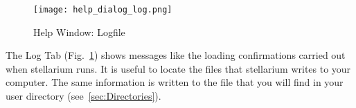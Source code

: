 \begin{figure}[htbp]
\centering\texttt{[image: help\_dialog\_log.png]}
\caption{Help Window: Logfile}
\label{fig:gui:help:log}
\end{figure}

The Log Tab (Fig.~\ref{fig:gui:help:log}) shows messages like the loading confirmations carried out when
stellarium runs. It is useful to locate the files that stellarium writes
to your computer. The same information is written to  the file  that you will
find in your user directory (see~\ref{sec:Directories}).




